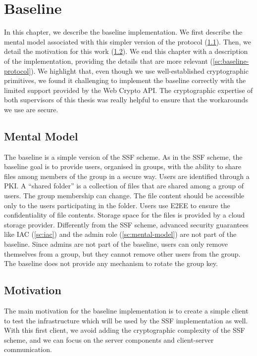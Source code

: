 \chapter{Baseline}\label{ch:baseline}

In this chapter, we describe the baseline implementation.
We first describe the mental model
associated with this simpler version
of the protocol (\cref{sc:baseline-mental-model}).
Then, we detail the motivation for this work (\cref{sc:baseline-motivations}).
We end this chapter with a description of the
implementation, providing the details
that are more relevant (\cref{sc:baseline-protocol}).
We highlight that, even though we use well-established
cryptographic primitives, we found it
challenging to implement the baseline correctly
with the limited support provided by the
Web Crypto API.
The cryptographic expertise of both supervisors
of this thesis was really helpful to ensure that the
workarounds we use are secure.

\section{Mental Model}\label{sc:baseline-mental-model}
The baseline is a simple version of the SSF scheme.
As in the SSF scheme, the baseline goal is to provide users, organised in groups, with
the ability to share files among members of the group in
a secure way.
Users are identified through a PKI.
A ``shared folder'' is a collection of files that are shared 
among a group of users. 
The group membership can change.
The file content 
should be accessible only to the users participating 
in the folder. Users use E2EE to ensure the confidentiality
of file contents.
Storage space for the files is
provided by a cloud storage provider. 
Differently from the SSF scheme, advanced security guarantees
like IAC (\cref{sc:iac}) and the admin role (\cref{sc:mental-model}) are not part of the baseline.
Since admins are not part of the baseline, users can only remove themselves from a group, but they cannot remove other users from the group.
The baseline does not provide any mechanism to rotate the group key.

\section{Motivation}\label{sc:baseline-motivations}

The main motivation for the baseline implementation is
to create a simple client to test the infrastructure which 
will be used by the SSF implementation as well.
With this first client, we avoid adding the cryptographic complexity of the SSF scheme, and we can focus
on the server components and client-server communication.

